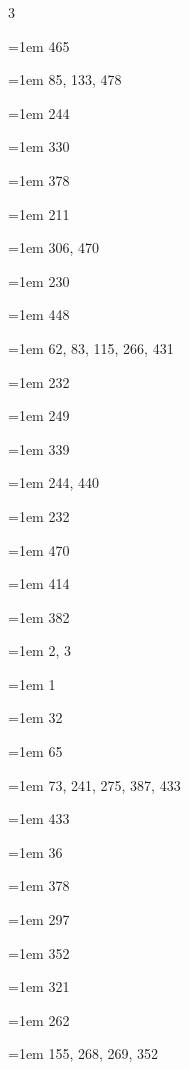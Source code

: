 \begin{multicols}{3}\footnotesize\setlength{\parindent}{0pt}\raggedright
\hangindent=1em  465\par
\hangindent=1em  85, 133, 478\par
\hangindent=1em  244\par
\hangindent=1em  330\par
\hangindent=1em  378\par
\hangindent=1em  211\par
\hangindent=1em  306, 470\par
\hangindent=1em  230\par
\hangindent=1em  448\par
\hangindent=1em  62, 83, 115, 266, 431\par
\hangindent=1em  232\par
\hangindent=1em  249\par
\hangindent=1em  339\par
\hangindent=1em  244, 440\par
\hangindent=1em  232\par
\hangindent=1em  470\par
\hangindent=1em  414\par
\hangindent=1em  382\par
\hangindent=1em  2, 3\par
\hangindent=1em  1\par
\hangindent=1em  32\par
\hangindent=1em  65\par
\hangindent=1em  73, 241, 275, 387, 433\par
\hangindent=1em  433\par
\hangindent=1em  36\par
\hangindent=1em  378\par
\hangindent=1em  297\par
\hangindent=1em  352\par
\hangindent=1em  321\par
\hangindent=1em  262\par
\hangindent=1em  155, 268, 269, 352\par

\end{multicols}
